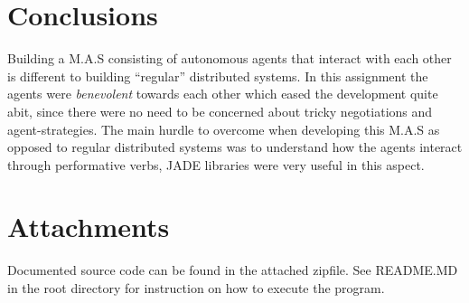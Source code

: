 \documentclass[a4paper, 11pt]{article}
\begin{document}
\section*{Conclusions}
Building a M.A.S consisting of autonomous agents that interact with each other is different to building ``regular'' distributed systems. In this assignment the agents were \textit{benevolent} towards each other which eased the development quite abit, since there were no need to be concerned about tricky negotiations and agent-strategies. The main hurdle to overcome when developing this M.A.S as opposed to regular distributed systems was to understand how the agents interact through performative verbs, JADE libraries were very useful in this aspect.

\section*{Attachments}
Documented source code can be found in the attached zipfile. See README.MD in the root directory for instruction on how to execute the program.

{}

\end{document}
